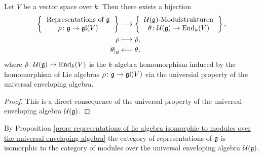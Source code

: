 \begin{prop}\label{prop: representations of lie algebra isomorphic to modules over the universal enveloping algebra}
 Let $V$ be a vector space over $k$. Then there exists a bijection
 \begin{align*}
  \left\{
   \begin{tabular}{c}
    Representations of $\g$ \\
    $\rho \colon \g \to \gl(V)$
   \end{tabular}
  \right\}
  &\longrightarrow
  \left\{
   \begin{tabular}{c}
    $\Ue(\g)$-Modulstrukturen \\
    $\theta \colon \Ue(\g) \to \End_k(V)$
   \end{tabular}
  \right\}, \\
          \rho &\longmapsto   \hat{\rho}, \\
  \theta|_{\g} &\longmapsfrom \theta,
 \end{align*}
 where $\hat{\rho} \colon \mathcal{U}(\mathfrak{g}) \to \operatorname{End}_k(V)$ is the $k$-algebra homomorphism induced by the homomorphism of Lie algebras $\rho \colon \mathfrak{g} \to \mathfrak{gl}(V)$ via the universial property of the universal enveloping algebra.
\end{prop}
\begin{proof}
 This is a direct consequence of the universal property of the universal enveloping algebra $\mathcal{U}(\mathfrak{g})$.
\end{proof}


\begin{rem}
 By Proposition \ref{prop: representations of lie algebra isomorphic to modules over the universal enveloping algebra} the category of representations of $\mathfrak{g}$ is isomorphic to the category of modules over the universal enveloping algebra $\mathcal{U}(\mathfrak{g})$.
\end{rem}



